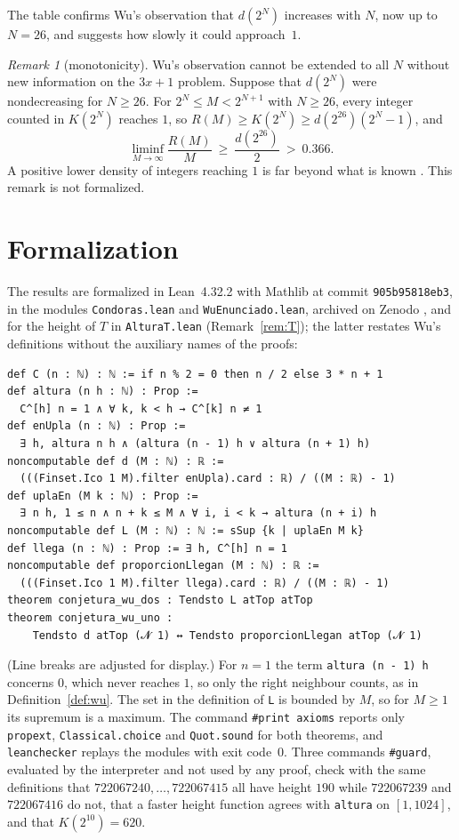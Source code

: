 \documentclass[11pt]{amsart}
\theoremstyle{definition}
\theoremstyle{remark}
\newtheorem{remark}[theorem]{Remark}
\newcommand{\lean}[1]{\nolinkurl{#1}}
\begin{document}
The table confirms Wu's observation that $d(2^N)$ increases with $N$, now up to $N=26$, and suggests how slowly it could approach~$1$.

\begin{remark}[monotonicity]\label{rem:mono}
Wu's observation cannot be extended to all $N$ without new information on the $3x+1$ problem. Suppose that $d(2^N)$ were nondecreasing for $N\ge26$. For $2^N\le M<2^{N+1}$ with $N\ge26$, every integer counted in $K(2^N)$ reaches $1$, so $R(M)\ge K(2^N)\ge d(2^{26})(2^N-1)$, and
\[
\liminf_{M\to\infty}\frac{R(M)}{M}\ \ge\ \frac{d(2^{26})}2\ >\ 0.366 .
\]
A positive lower density of integers reaching $1$ is far beyond what is known \cite{KL03}. This remark is not formalized.
\end{remark}

\section{Formalization}\label{sec:formal}

The results are formalized in Lean~4.32.2 with Mathlib at commit \lean{905b95818eb3}, in the modules \lean{Condoras.lean} and \lean{WuEnunciado.lean}, archived on Zenodo \cite{Artifact}, and for the height of $T$ in \lean{AlturaT.lean} (Remark~\ref{rem:T}); the latter restates Wu's definitions without the auxiliary names of the proofs:

\begin{Verbatim}[fontsize=\small]
def C (n : ℕ) : ℕ := if n % 2 = 0 then n / 2 else 3 * n + 1
def altura (n h : ℕ) : Prop :=
  C^[h] n = 1 ∧ ∀ k, k < h → C^[k] n ≠ 1
def enUpla (n : ℕ) : Prop :=
  ∃ h, altura n h ∧ (altura (n - 1) h ∨ altura (n + 1) h)
noncomputable def d (M : ℕ) : ℝ :=
  (((Finset.Ico 1 M).filter enUpla).card : ℝ) / ((M : ℝ) - 1)
def uplaEn (M k : ℕ) : Prop :=
  ∃ n h, 1 ≤ n ∧ n + k ≤ M ∧ ∀ i, i < k → altura (n + i) h
noncomputable def L (M : ℕ) : ℕ := sSup {k | uplaEn M k}
def llega (n : ℕ) : Prop := ∃ h, C^[h] n = 1
noncomputable def proporcionLlegan (M : ℕ) : ℝ :=
  (((Finset.Ico 1 M).filter llega).card : ℝ) / ((M : ℝ) - 1)
theorem conjetura_wu_dos : Tendsto L atTop atTop
theorem conjetura_wu_uno :
    Tendsto d atTop (𝓝 1) ↔ Tendsto proporcionLlegan atTop (𝓝 1)
\end{Verbatim}

\noindent (Line breaks are adjusted for display.) For $n=1$ the term \texttt{altura (n - 1) h} concerns $0$, which never reaches $1$, so only the right neighbour counts, as in Definition~\ref{def:wu}. The set in the definition of \texttt{L} is bounded by $M$, so for $M\ge1$ its supremum is a maximum. The command \texttt{\#print axioms} reports only \texttt{propext}, \texttt{Classical.choice} and \texttt{Quot.sound} for both theorems, and \texttt{leanchecker} replays the modules with exit code~$0$. Three commands \texttt{\#guard}, evaluated by the interpreter and not used by any proof, check with the same definitions that $722067240,\dots,722067415$ all have height $190$ while $722067239$ and $722067416$ do not, that a faster height function agrees with \texttt{altura} on $[1,1024]$, and that $K(2^{10})=620$.
\end{document}
